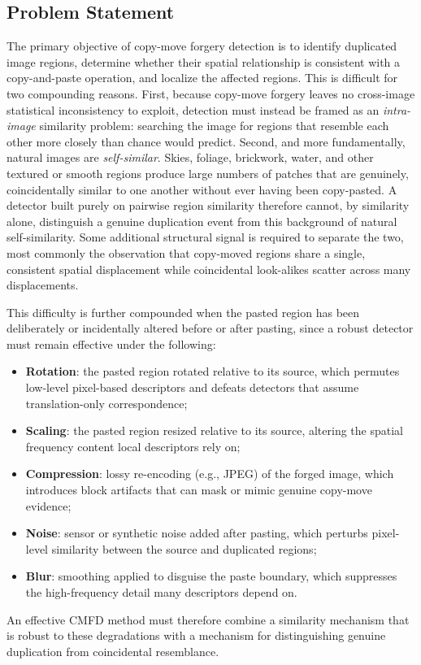 \documentclass[conference]{IEEEtran}
\begin{document}
\subsection{Problem Statement}
The primary objective of copy-move forgery detection is to identify duplicated image regions, determine whether their spatial relationship is consistent with a copy-and-paste operation, and localize the affected regions. This is difficult for two compounding reasons. First, because copy-move forgery leaves no cross-image statistical inconsistency to exploit, detection must instead be framed as an \emph{intra-image} similarity problem: searching the image for regions that resemble each other more closely than chance would predict. Second, and more fundamentally, natural images are \emph{self-similar}. Skies, foliage, brickwork, water, and other textured or smooth regions produce large numbers of patches that are genuinely, coincidentally similar to one another without ever having been copy-pasted. A detector built purely on pairwise region similarity therefore cannot, by similarity alone, distinguish a genuine duplication event from this background of natural self-similarity. Some additional structural signal is required to separate the two, most commonly the observation that copy-moved regions share a single, consistent spatial displacement while coincidental look-alikes scatter across many displacements.

This difficulty is further compounded when the pasted region has been deliberately or incidentally altered before or after pasting, since a robust detector must remain effective under the following:
\begin{itemize}
\item \textbf{Rotation}: the pasted region rotated relative to its source, which permutes low-level pixel-based descriptors and defeats detectors that assume translation-only correspondence;
\item \textbf{Scaling}: the pasted region resized relative to its source, altering the spatial frequency content local descriptors rely on;
\item \textbf{Compression}: lossy re-encoding (e.g., JPEG) of the forged image, which introduces block artifacts that can mask or mimic genuine copy-move evidence;
\item \textbf{Noise}: sensor or synthetic noise added after pasting, which perturbs pixel-level similarity between the source and duplicated regions;
\item \textbf{Blur}: smoothing applied to disguise the paste boundary, which suppresses the high-frequency detail many descriptors depend on.
\end{itemize}
An effective CMFD method must therefore combine a similarity mechanism that is robust to these degradations with a mechanism for distinguishing genuine duplication from coincidental resemblance.
\end{document}
